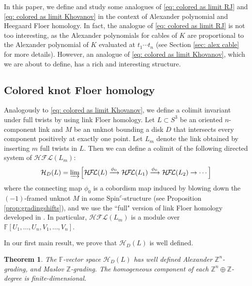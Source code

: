 \documentclass{amsart}
\newtheorem{theorem}{Theorem}[section]
\newcommand{\F}{\mathbb{F}}
\newcommand{\cHFL}{\mathcal{H\!F\! L}}
\newcommand{\Spin}{\text{Spin}^{c}}
\newcommand{\HD}{\mathcal{H}}
\newcommand{\Z}{\mathbb{Z}}
\begin{document}
 


In this paper, we define and study some analogues of \eqref{eq: colored as limit RJ} and \eqref{eq: colored as limit Khovanov} in the context of Alexander polynomial and Heegaard Floer homology.  In fact, the analogue of
\eqref{eq: colored as limit RJ} is not too interesting, as the Alexander polynomials for cables of $K$ are proportional to the Alexander polynomial of $K$ evaluated at $t_1\cdots t_n$ (see Section \ref{sec: alex cable} for more details). However, an analogue of \eqref{eq: colored as limit Khovanov}, which we are about to define, has a rich and interesting structure.


\subsection{Colored knot Floer homology}
Analogously to \eqref{eq: colored as limit Khovanov}, we define a colimit invariant under full twists by using link Floer homology. Let $L\subset S^3$ be an oriented $n$-component link and $M$ be an unknot bounding a disk $D$ that intersects every component positively at exactly one point. Let $L_m$ denote the link obtained by inserting $m$ full twists in $L$. Then we can define a colimit of the following directed system of $\cHFL(L_m)$: 
\begin{equation}
\label{eq: def HD}
\HD_D(L)=\varinjlim\left[\cHFL(L)\xrightarrow{\phi_0}\cHFL(L_1)\xrightarrow{\phi_0}\cHFL(L_2)\to\cdots\right]
\end{equation}
where the connecting map $\phi_0$ is a cobordism map induced by blowing down the $(-1)$-framed unknot $M$ in some $\Spin$-structure (see Proposition \ref{prop:gradingshifts}), and  we use the ``full" version of link Floer homology  developed in  \cite{Zemke, Zemke2}. In particular, $\cHFL(L_m)$ is a module over $\F[U_1,\ldots,U_n,V_1,\ldots,V_n]$.



In our first main result, we prove that $\HD_{D}(L)$ is well defined. 

\begin{theorem}
\label{thm: intro well defined}
The $\F$-vector space  $\HD_{D}(L)$ has well defined Alexander $\Z^n$-grading, and Maslov $\Z$-grading. The homogeneous component of each $\Z^n\oplus \Z$-degree is finite-dimensional. 
\end{theorem}
\end{document}

